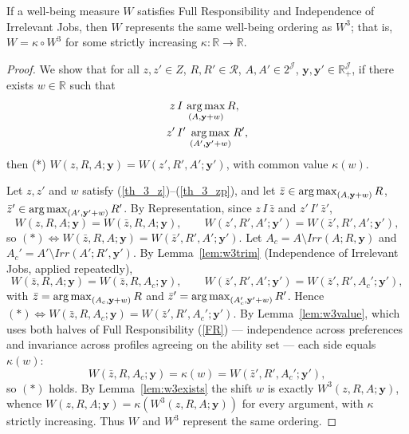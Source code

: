 \begin{theorem}
\label{thm:w3}
If a well-being measure $W$ satisfies Full Responsibility and Independence of
Irrelevant Jobs, then $W$ represents the same well-being ordering as $W^3$; that
is, $W=\kappa\circ W^3$ for some strictly increasing
$\kappa:\mathbb R\to\mathbb R$.
\end{theorem}

\begin{proof}
We show that for all $z,z'\in Z$, $R,R'\in\mathcal R$, $A,A'\in 2^{\mathcal J}$,
$\mathbf y,\mathbf y'\in\mathbb R_+^{\mathcal J}$, if there exists
$w\in\mathbb R$ such that
\begin{align}
z\,&I\,\operatorname*{arg\,max}_{(A,\mathbf y+w)}R, \label{th_3_z}\\
z'\,&I'\,\operatorname*{arg\,max}_{(A',\mathbf y'+w)}R', \label{th_3_zp}
\end{align}
then (*) $W(z,R,A;\mathbf y)=W(z',R',A';\mathbf y')$, with common value
$\kappa(w)$.

Let $z,z'$ and $w$ satisfy (\ref{th_3_z})--(\ref{th_3_zp}), and let
$\bar z\in\operatorname*{arg\,max}_{(A,\mathbf y+w)}R$, $\bar z'\in\operatorname*{arg\,max}_{(A',\mathbf
y'+w)}R'$. By Representation, since $z\,I\,\bar z$ and $z'\,I'\,\bar z'$,
\begin{equation*}
W(z,R,A;\mathbf y)=W(\bar z,R,A;\mathbf y),\qquad
W(z',R',A';\mathbf y')=W(\bar z',R',A';\mathbf y'),
\end{equation*}
so $(*)\Leftrightarrow W(\bar z,R,A;\mathbf y)=W(\bar z',R',A';\mathbf y')$.
Let $A_c=A\setminus Irr(A;R,\mathbf y)$ and $A_c'=A'\setminus Irr(A';R',\mathbf
y')$. By Lemma~\ref{lem:w3trim} (Independence of Irrelevant Jobs, applied
repeatedly),
\begin{equation*}
W(\bar z,R,A;\mathbf y)=W(\bar z,R,A_c;\mathbf y),\qquad
W(\bar z',R',A';\mathbf y')=W(\bar z',R',A_c';\mathbf y'),
\end{equation*}
with $\bar z=\operatorname*{arg\,max}_{(A_c,\mathbf y+w)}R$ and
$\bar z'=\operatorname*{arg\,max}_{(A_c',\mathbf y'+w)}R'$. Hence
$(*)\Leftrightarrow W(\bar z,R,A_c;\mathbf y)=W(\bar z',R',A_c';\mathbf y')$.
By Lemma~\ref{lem:w3value}, which uses both halves of Full Responsibility
(\ref{FR}) --- independence across preferences and invariance across profiles
agreeing on the ability set --- each side equals $\kappa(w)$:
\begin{equation*}
W(\bar z,R,A_c;\mathbf y)=\kappa(w)=W(\bar z',R',A_c';\mathbf y'),
\end{equation*}
so $(*)$ holds. By Lemma~\ref{lem:w3exists} the shift $w$ is exactly
$W^3(z,R,A;\mathbf y)$, whence $W(z,R,A;\mathbf y)=\kappa(W^3(z,R,A;\mathbf y))$
for every argument, with $\kappa$ strictly increasing. Thus $W$ and $W^3$
represent the same ordering.
\end{proof}

